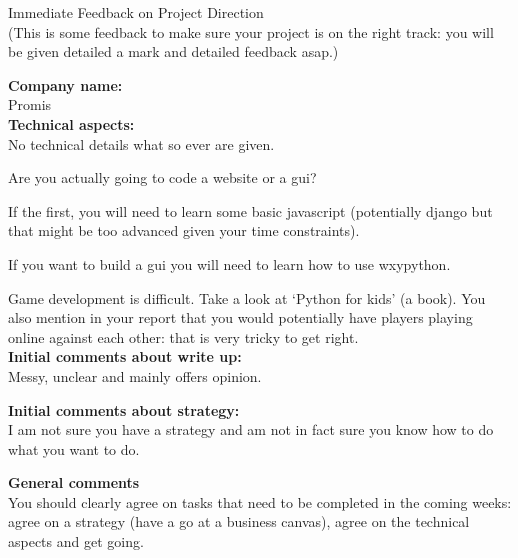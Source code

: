 \documentclass{article}
\begin{document}
\begin{center}
\Huge{Immediate Feedback on Project Direction}\\
\tiny{(This is some feedback to make sure your project is on the right track: you will be given detailed a mark and detailed feedback asap.)}
\end{center}


\normalsize
\textbf{Company name:}\\

Promis \\

\textbf{Technical aspects:}\\

No technical details what so ever are given.

Are you actually going to code a website or a gui?

If the first, you will need to learn some basic javascript (potentially django but that might be too advanced given your time constraints).

If you want to build a gui you will need to learn how to use wxypython.

Game development is difficult. Take a look at `Python for kids' (a book).
You also mention in your report that you would potentially have players playing online against each other: that is very tricky to get right.\\

\textbf{Initial comments about write up:}\\

Messy, unclear and mainly offers opinion.

\textbf{Initial comments about strategy:}\\

I am not sure you have a strategy and am not in fact sure you know how to do what you want to do.

\textbf{General comments}\\

You should clearly agree on tasks that need to be completed in the coming weeks: agree on a strategy (have a go at a business canvas), agree on the technical aspects and get going.
\end{document}
